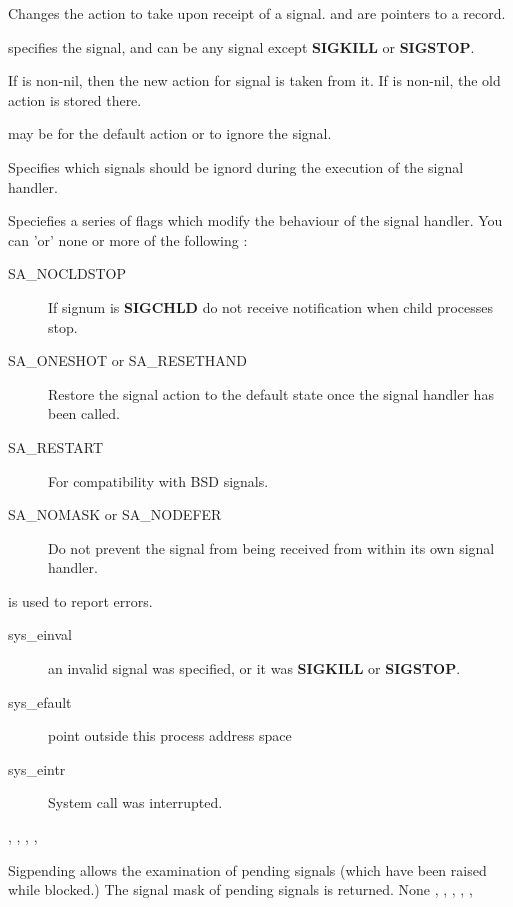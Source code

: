 { Changes the action to take upon receipt of a signal.  and
 are pointers to a  record.

 specifies the signal, and can be any signal except
\textbf{SIGKILL} or \textbf{SIGSTOP}.

If  is non-nil, then the new action for signal  is taken
from it. If  is non-nil, the old action is stored there.

 may be  for the default action or
 to ignore the signal.

 Specifies which signals should be ignord during the execution
of the signal handler.

 Speciefies a series of flags which modify the behaviour of
the signal handler. You can 'or' none or more of the following :
\begin{description}
\item[SA\_NOCLDSTOP] If signum is \textbf{SIGCHLD} do not receive
notification when child processes stop.
\item[SA\_ONESHOT or SA\_RESETHAND] Restore the signal action to the default
state once the signal handler has been called.
\item[SA\_RESTART] For compatibility with BSD signals.
\item[SA\_NOMASK or SA\_NODEFER] Do not prevent the signal from being received
from within its own signal handler.
\end{description}
}
{ is used to report errors.
\begin{description}
\item[sys\_einval] an invalid signal was specified, or it was
\textbf{SIGKILL} or \textbf{SIGSTOP}.
\item[sys\_efault]  point outside this process address space
\item[sys\_eintr] System call was interrupted.
\end{description}
}
{
, , , ,
}

{
Sigpending allows the examination of pending signals (which have been raised
while blocked.) The signal mask of pending signals is returned.
}
{None}
{, , , ,
,  }

